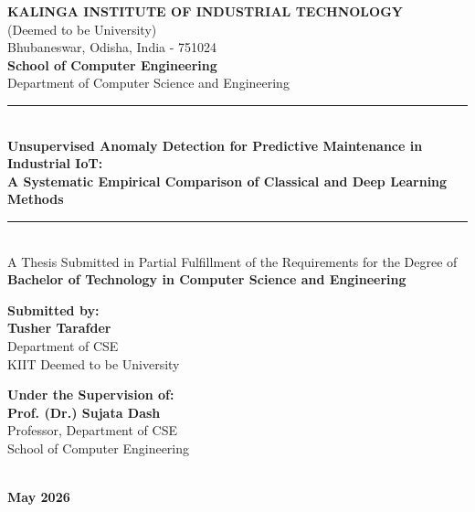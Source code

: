 \documentclass[12pt,a4paper,oneside]{report}
\begin{document}
\begin{titlepage}
    \centering
    \vspace*{0.5cm}
    
    {\Large \textbf{KALINGA INSTITUTE OF INDUSTRIAL TECHNOLOGY}}\\[0.2cm]
    {\large (Deemed to be University)}\\[0.2cm]
    {\small Bhubaneswar, Odisha, India - 751024}\\[0.4cm]
    {\large \textbf{School of Computer Engineering}}\\[0.2cm]
    {\normalsize Department of Computer Science and Engineering}\\[1.5cm]
    
    \rule{\textwidth}{1.5pt}\\[0.4cm]
    {\LARGE \textbf{Unsupervised Anomaly Detection for Predictive Maintenance in Industrial IoT:}}\\[0.3cm]
    {\Large \textbf{A Systematic Empirical Comparison of Classical and Deep Learning Methods}}\\[0.4cm]
    \rule{\textwidth}{1.5pt}\\[1.5cm]
    
    {\large A Thesis Submitted in Partial Fulfillment of the Requirements for the Degree of}\\[0.2cm]
    {\large \textbf{Bachelor of Technology in Computer Science and Engineering}}\\[1.5cm]
    
    \begin{minipage}{0.45\textwidth}
        \flushleft
        \textbf{Submitted by:}\\
        {\large \textbf{Tusher Tarafder}}\\
        Department of CSE\\
        KIIT Deemed to be University
    \end{minipage}
    \hfill
    \begin{minipage}{0.48\textwidth}
        \flushright
        \textbf{Under the Supervision of:}\\
        {\large \textbf{Prof. (Dr.) Sujata Dash}}\\
        Professor, Department of CSE\\
        School of Computer Engineering
    \end{minipage}\\[2.5cm]
    
    {\large \textbf{May 2026}}
\end{titlepage}
\end{document}
